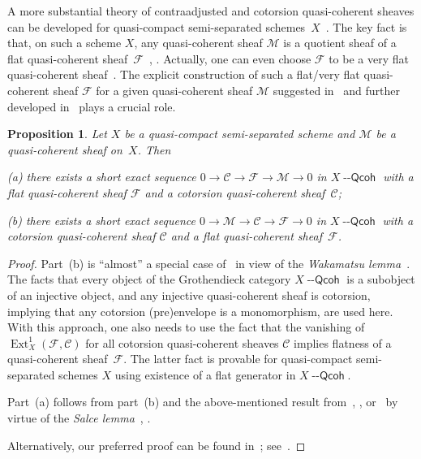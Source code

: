\documentclass[12pt,a4paper]{amsart}
\newcommand{\+}{\protect\nobreakdash-}
\renewcommand{\:}{\colon}
\newcommand{\rarrow}{\longrightarrow}
\DeclareMathOperator{\Ext}{Ext}
\newcommand{\Qcoh}{{\operatorname{\mathsf{--Qcoh}}}}
\newcommand{\cM}{\mathcal M}
\newcommand{\cF}{\mathcal F}
\newcommand{\cC}{\mathcal C}
\theoremstyle{plain}
\newtheorem{prop}[thm]{Proposition}
\theoremstyle{definition}
\begin{document}
 A more substantial theory of contraadjusted and cotorsion
quasi-coherent sheaves can be developed for quasi-compact
semi-separated schemes~$X$ \,\cite[Section~4.1]{Pcosh}.
 The key fact is that, on such a scheme $X$, any quasi-coherent
sheaf $\cM$ is a quotient sheaf of a flat quasi-coherent sheaf~$\cF$
\,\cite[Section~2.4]{M-n}, \cite[Section~3.2]{M-th}.
 Actually, one can even choose $\cF$ to be a very flat quasi-coherent
sheaf~\cite[Lemma~4.1.1]{Pcosh}.
 The explicit construction of such a flat/very flat quasi-coherent
sheaf $\cF$ for a given quasi-coherent sheaf $\cM$ suggested
in~\cite[Lemma~A.1]{EP} and further developed in~\cite[Lemmas~4.1.1
and~4.1.8]{Pcosh} plays a crucial role.

\begin{prop} \label{flat-cotorsion-pair-in-qcoh-sheaves}
 Let $X$ be a quasi-compact semi-separated scheme and\/ $\cM$ be
a quasi-coherent sheaf on~$X$.
 Then \par
\textup{(a)} there exists a short exact sequence\/ $0\rarrow\cC\rarrow
\cF\rarrow\cM\rarrow0$ in $X\Qcoh$ with a flat quasi-coherent sheaf\/
$\cF$ and a cotorsion quasi-coherent sheaf\/~$\cC$; \par
\textup{(b)} there exists a short exact sequence\/ $0\rarrow\cM\rarrow
\cC\rarrow\cF\rarrow0$ in $X\Qcoh$ with a cotorsion quasi-coherent
sheaf\/ $\cC$ and a flat quasi-coherent sheaf\/~$\cF$.
\end{prop}

\begin{proof}
 Part~(b) is ``almost'' a special case of~\cite[Corollary~4.2]{EE}
in view of the \emph{Wakamatsu lemma}~\cite[Lemma~2.1.2]{Xu}.
 The facts that every object of the Grothendieck category $X\Qcoh$
is a subobject of an injective object, and any injective
quasi-coherent sheaf is cotorsion, implying that any cotorsion
(pre)envelope is a monomorphism, are used here.
 With this approach, one also needs to use the fact that the vanishing
of $\Ext^1_X(\cF,\cC)$ for all cotorsion quasi-coherent sheaves $\cC$
implies flatness of a quasi-coherent sheaf~$\cF$.
 The latter fact is provable for quasi-compact semi-separated
schemes $X$ using existence of a flat generator in $X\Qcoh$.

 Part~(a) follows from part~(b) and the above-mentioned result
from~\cite[Section~2.4]{M-n}, \cite[Section~3.2]{M-th},
or~\cite[Lemma~A.1]{EP} by virtue of the \emph{Salce
lemma}~\cite{Sal}, \cite[Lemma~B.1.1(a)]{Pcosh}.

 Alternatively, our preferred proof can be found
in~\cite[Section~4.1]{Pcosh}; see~\cite[Corollary~4.1.11(a\+-b)]{Pcosh}.
\end{proof}
\end{document}

